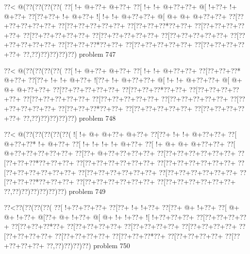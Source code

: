 \vbox{\vbox{\goo
\0??<\- @(\0??(\0??(\0??(\0??(
\0??[\- !+\- @+\0??+\- @+\0??+
\0??[\- !+\- !+\- @+\0??+\0??+
\- @[\- !+\0??+\- !+\- @+\0??+
\0??[\0??+\0??+\- !+\- @+\0??+
\- ![\- !+\- !+\- @+\0??+\0??+
\- @[\- @+\- @+\- @+\0??+\0??+
\0??[\0??+\0??+\0??+\0??+\0??+
\0??[\0??+\0??+\0??+\0??+\0??+
\0??[\0??+\0??+\0??*\0??+\0??+
\0??[\0??+\0??+\0??+\0??+\0??+
\0??[\0??+\0??+\0??+\0??+\0??+
\0??[\0??+\0??+\0??+\0??+\0??+
\0??[\0??+\0??+\0??+\0??+\0??+
\0??[\0??+\0??+\0??+\0??+\0??+
\0??[\0??+\0??+\0??*\0??+\0??+
\0??[\0??+\0??+\0??+\0??+\0??+
\0??[\0??+\0??+\0??+\0??+\0??+
\0??,\0??)\0??)\0??)\0??)\0??)
}
\hfil problem 747\hfil\break
}

\vbox{\vbox{\goo
\0??<\- @(\0??(\0??(\0??(\0??(
\0??[\- !+\- @+\0??+\- @+\0??+
\0??[\- !+\- !+\- @+\0??+\0??+
\0??[\0??+\0??+\0??*\- @+\0??+
\0??[\0??+\- !+\- !+\- @+\0??+
\- ![\0??+\- !+\- @+\0??+\0??+
\- @[\- !+\- !+\- @+\0??+\0??+
\- @[\- @+\- @+\- @+\0??+\0??+
\0??[\0??+\0??+\0??+\0??+\0??+
\0??[\0??+\0??+\0??*\0??+\0??+
\0??[\0??+\0??+\0??+\0??+\0??+
\0??[\0??+\0??+\0??+\0??+\0??+
\0??[\0??+\0??+\0??+\0??+\0??+
\0??[\0??+\0??+\0??+\0??+\0??+
\0??[\0??+\0??+\0??+\0??+\0??+
\0??[\0??+\0??+\0??*\0??+\0??+
\0??[\0??+\0??+\0??+\0??+\0??+
\0??[\0??+\0??+\0??+\0??+\0??+
\0??,\0??)\0??)\0??)\0??)\0??)
}
\hfil problem 748\hfil\break
}

\vbox{\vbox{\goo
\0??<\- @(\0??(\0??(\0??(\0??(\0??(
\- ![\- !+\- @+\- @+\0??+\- @+\0??+
\0??[\0??+\- !+\- !+\- @+\0??+\0??+
\0??[\- @+\0??+\0??*\- !+\- @+\0??+
\0??[\- !+\- !+\- !+\- !+\- @+\0??+
\0??[\- !+\- @+\- @+\- @+\0??+\0??+
\0??[\- @+\0??+\0??+\0??+\0??+\0??+
\0??[\0??+\- @+\0??+\0??+\0??+\0??+
\0??[\0??+\0??+\0??+\0??+\0??+\0??+
\0??[\0??+\0??+\0??*\0??+\0??+\0??+
\0??[\0??+\0??+\0??+\0??+\0??+\0??+
\0??[\0??+\0??+\0??+\0??+\0??+\0??+
\0??[\0??+\0??+\0??+\0??+\0??+\0??+
\0??[\0??+\0??+\0??+\0??+\0??+\0??+
\0??[\0??+\0??+\0??+\0??+\0??+\0??+
\0??[\0??+\0??+\0??*\0??+\0??+\0??+
\0??[\0??+\0??+\0??+\0??+\0??+\0??+
\0??[\0??+\0??+\0??+\0??+\0??+\0??+
\0??,\0??)\0??)\0??)\0??)\0??)\0??)
}
\hfil problem 749\hfil\break
}

\vbox{\vbox{\goo
\0??<\0??(\0??(\0??(\0??(
\0??[\- !+\0??+\0??+\0??+
\0??[\0??+\- !+\- !+\0??+
\0??[\0??+\- @+\- !+\0??+
\0??[\- @+\- @+\- !+\0??+
\- @[\0??+\- @+\- !+\0??+
\- @[\- @+\- !+\- !+\0??+
\- ![\- !+\0??+\0??+\0??+
\0??[\0??+\0??+\0??+\0??+
\0??[\0??+\0??+\0??*\0??+
\0??[\0??+\0??+\0??+\0??+
\0??[\0??+\0??+\0??+\0??+
\0??[\0??+\0??+\0??+\0??+
\0??[\0??+\0??+\0??+\0??+
\0??[\0??+\0??+\0??+\0??+
\0??[\0??+\0??+\0??*\0??+
\0??[\0??+\0??+\0??+\0??+
\0??[\0??+\0??+\0??+\0??+
\0??,\0??)\0??)\0??)\0??)
}
\hfil problem 750\hfil\break
}

